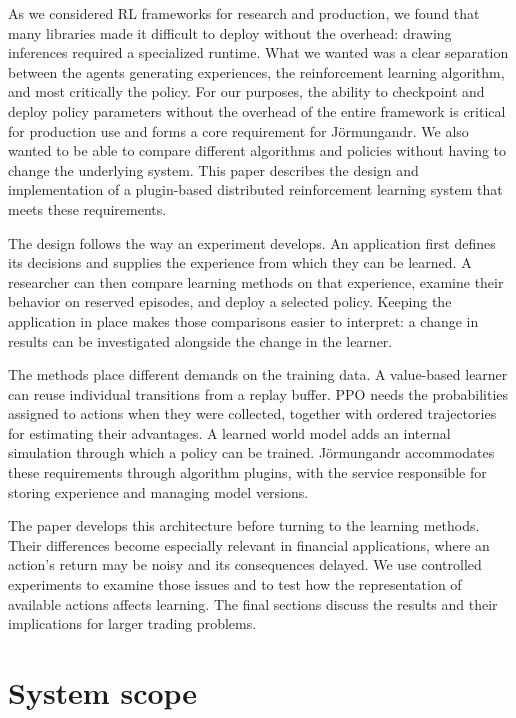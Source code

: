 \documentclass{strategynet-journal}
\begin{document}
\begin{SNcolumns}

As we considered RL frameworks for research and production, we found that 
many libraries made it difficult to deploy without the overhead: drawing inferences
required a specialized runtime.  What we 
wanted was a clear separation between the agents generating experiences,
the reinforcement learning algorithm, and most critically the policy.  
For our purposes, the ability to checkpoint and deploy policy parameters without the 
overhead of the entire framework is critical for production use and forms a core
requirement for Jörmungandr.  We also wanted to be able to compare different 
algorithms and policies without having to change the underlying system.  
This paper describes the design and implementation of a plugin-based distributed 
reinforcement learning system that meets these requirements.

The design follows the way an experiment develops. An application first
defines its decisions and supplies the experience from which they can be
learned. A researcher can then compare learning methods on that experience,
examine their behavior on reserved episodes, and deploy a selected policy.
Keeping the application in place makes those comparisons easier to interpret:
a change in results can be investigated alongside the change in the learner.

The methods place different demands on the training data. A value-based
learner can reuse individual transitions from a replay buffer. PPO needs the
probabilities assigned to actions when they were collected, together with
ordered trajectories for estimating their advantages. A learned world model
adds an internal simulation through which a policy can be trained. Jörmungandr
accommodates these requirements through algorithm plugins, with the service
responsible for storing experience and managing model versions.

The paper develops this architecture before turning to the learning methods.
Their differences become especially relevant in financial applications, where
an action's return may be noisy and its consequences delayed. We use controlled
experiments to examine those issues and to test how the representation of
available actions affects learning. The final sections discuss the results
and their implications for larger trading problems.

\end{SNcolumns}

\section{System scope}
\end{document}
